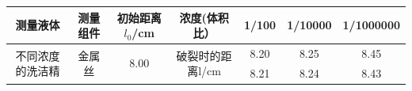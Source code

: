 \documentclass[12pt]{ustcreport}
\begin{document}
\begin{table}[H]
    \centering
    \begin{tabular}{|c|c|c|c|c|c|c|}
    \hline
    测量液体                      & 测量组件                 & 初始距离$l_0$/cm           & 浓度(体积比）                     & 1/100 & 1/10000 & 1/1000000 \\ \hline
    \multirow{2}{*}{不同浓度的洗洁精} & \multirow{2}{*}{金属丝} & \multirow{2}{*}{8.00} & \multirow{2}{*}{破裂时的距离l/cm} & 8.20  & 8.25    & 8.45      \\ \cline{5-7} 
                              &                      &                       &                             & 8.21  & 8.24    & 8.43      \\ \hline
    \end{tabular}
\end{table}
\end{document}
